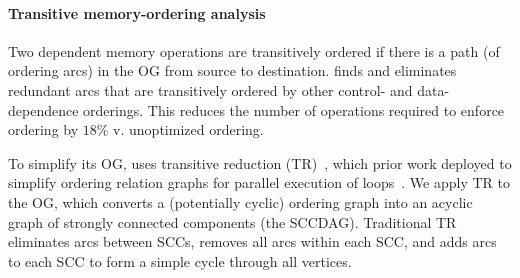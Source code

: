 \paragraph{Transitive memory-ordering analysis}
Two dependent memory operations are transitively ordered if there is a path (of
ordering arcs) in the OG from source to destination.
%
\riptide finds and eliminates redundant arcs that are
transitively ordered by other control- and data-dependence orderings.
%
%
%
%
%
%
%
This reduces the number of operations required to enforce ordering by $18\%$ v. unoptimized ordering.

To simplify its OG, \riptide uses transitive reduction (TR)~\cite{aho-tr}, which prior work
deployed to simplify ordering relation graphs for parallel
execution of loops~\cite{midkiff-padua,compiler-sync}.
%
%
%
%
%
We apply TR to the OG, which converts a (potentially cyclic) ordering 
graph into an acyclic graph of strongly connected components (the SCCDAG). 
%
Traditional TR eliminates arcs between SCCs,
removes all arcs within each SCC,
and adds arcs to each SCC to form a simple cycle through all vertices.

